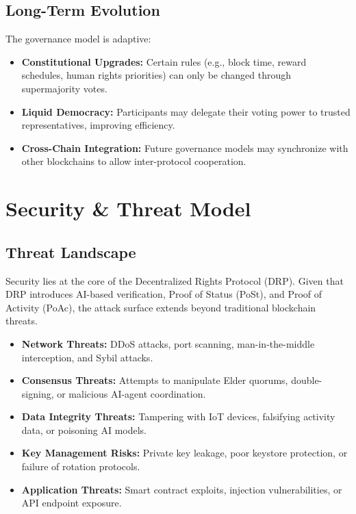 \documentclass[11pt,a4paper]{article}
\begin{document}
\subsection{Long-Term Evolution}
The governance model is adaptive:
\begin{itemize}
    \item \textbf{Constitutional Upgrades:} Certain rules (e.g., block time, reward schedules, human rights priorities) can only be changed through supermajority votes.
    \item \textbf{Liquid Democracy:} Participants may delegate their voting power to trusted representatives, improving efficiency.
    \item \textbf{Cross-Chain Integration:} Future governance models may synchronize with other blockchains to allow inter-protocol cooperation.
\end{itemize}


\section{Security \& Threat Model}

\subsection{Threat Landscape}
Security lies at the core of the Decentralized Rights Protocol (DRP). Given that DRP introduces AI-based verification, Proof of Status (PoSt), and Proof of Activity (PoAc), the attack surface extends beyond traditional blockchain threats.

\begin{itemize}
    \item \textbf{Network Threats:} DDoS attacks, port scanning, man-in-the-middle interception, and Sybil attacks.
    \item \textbf{Consensus Threats:} Attempts to manipulate Elder quorums, double-signing, or malicious AI-agent coordination.
    \item \textbf{Data Integrity Threats:} Tampering with IoT devices, falsifying activity data, or poisoning AI models.
    \item \textbf{Key Management Risks:} Private key leakage, poor keystore protection, or failure of rotation protocols.
    \item \textbf{Application Threats:} Smart contract exploits, injection vulnerabilities, or API endpoint exposure.
\end{itemize}
\end{document}
